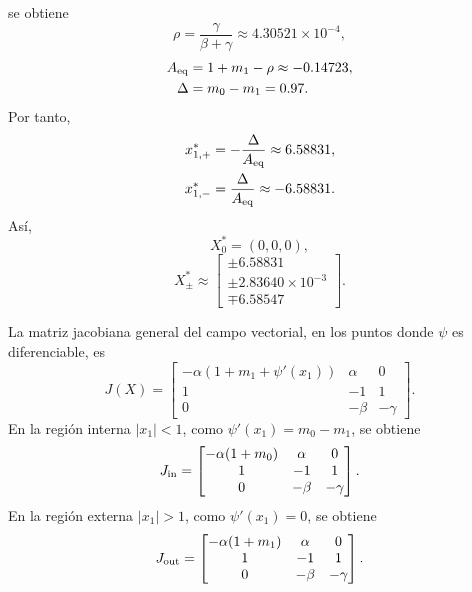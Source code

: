 \documentclass[journal]{IEEEtran}
\begin{document}
se obtiene
\[
\rho=
\frac{\gamma}{\beta+\gamma}
\approx
4.30521\times 10^{-4},
\]
\[
\begin{aligned}
A_{\rm eq}&=1+m_1-\rho \approx -0.14723,\\
\Delta&=m_0-m_1=0.97.
\end{aligned}
\]
Por tanto,
\[
\begin{aligned}
x_{1,+}^*&=-\frac{\Delta}{A_{\rm eq}}\approx 6.58831,\\
x_{1,-}^*&=\frac{\Delta}{A_{\rm eq}}\approx -6.58831.
\end{aligned}
\]
Así,
\begin{equation}
\label{eq:equilibria_ns_values}
X_0^*=(0,0,0),
\end{equation}
\begin{equation}
\label{eq:equilibria_ns_values_pm}
X_\pm^*
\approx
\begin{bmatrix}
\pm 6.58831\\
\pm 2.83640\times 10^{-3}\\
\mp 6.58547
\end{bmatrix}.
\end{equation}

La matriz jacobiana general del campo vectorial, en los puntos donde
\(\psi\) es diferenciable, es
\begin{equation}
J(X)
=
\begin{bmatrix}
-\alpha(1+m_1+\psi'(x_1)) & \alpha & 0\\
1 & -1 & 1\\
0 & -\beta & -\gamma
\end{bmatrix}.
\end{equation}
En la región interna \(|x_1|<1\), como \(\psi'(x_1)=m_0-m_1\), se obtiene
\begin{equation}
\label{eq:J_ns_inner}
J_{\rm in}
=
\begin{bmatrix}
-\alpha(1+m_0)&\alpha&0\\
1&-1&1\\
0&-\beta&-\gamma
\end{bmatrix}.
\end{equation}
En la región externa \(|x_1|>1\), como \(\psi'(x_1)=0\), se obtiene
\begin{equation}
\label{eq:J_ns_outer}
J_{\rm out}
=
\begin{bmatrix}
-\alpha(1+m_1)&\alpha&0\\
1&-1&1\\
0&-\beta&-\gamma
\end{bmatrix}.
\end{equation}
\end{document}
